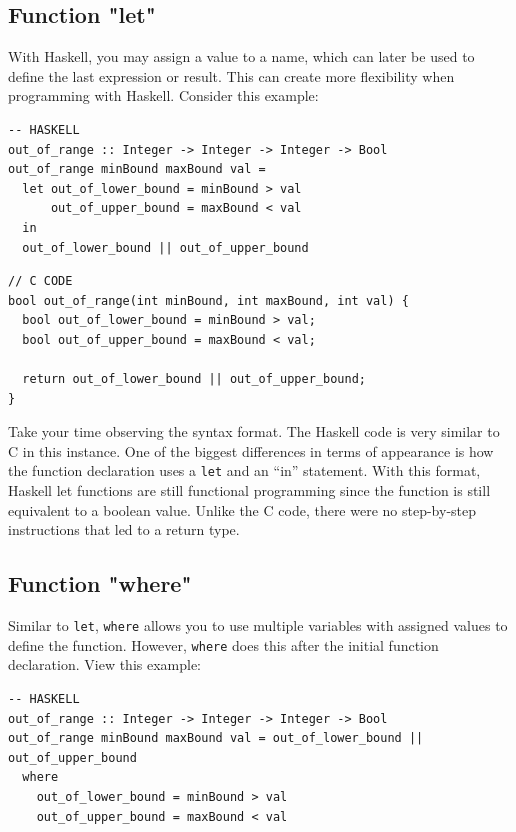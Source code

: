 \documentclass{article}
\begin{document}
\subsection{Function "let"}
\medskip\noindent
With Haskell, you may assign a value to a name, which can later be used to define the last expression or result. This can create more flexibility when programming with Haskell. Consider this example:

\begin{lstlisting}[style=HaskellStyle]
-- HASKELL
out_of_range :: Integer -> Integer -> Integer -> Bool
out_of_range minBound maxBound val =
  let out_of_lower_bound = minBound > val
      out_of_upper_bound = maxBound < val
  in
  out_of_lower_bound || out_of_upper_bound
\end{lstlisting}

\begin{lstlisting}[style=CStyle]
// C CODE
bool out_of_range(int minBound, int maxBound, int val) {
  bool out_of_lower_bound = minBound > val;
  bool out_of_upper_bound = maxBound < val;

  return out_of_lower_bound || out_of_upper_bound;
}
\end{lstlisting}

\medskip\noindent
Take your time observing the syntax format. The Haskell code is very similar to C in this instance. One of the biggest differences in terms of appearance is how the function declaration uses a \lstinline{let} and an “in” statement. With this format, Haskell let functions are still functional programming since the function is still equivalent to a boolean value. Unlike the C code, there were no step-by-step instructions that led to a return type.

\subsection{Function "where"}
\medskip\noindent
Similar to \verb|let|, \verb|where| allows you to use multiple variables with assigned values to define the function. However, \verb|where| does this after the initial function declaration. View this example:

\begin{lstlisting}[style=HaskellStyle]
-- HASKELL
out_of_range :: Integer -> Integer -> Integer -> Bool
out_of_range minBound maxBound val = out_of_lower_bound || out_of_upper_bound
  where
    out_of_lower_bound = minBound > val
    out_of_upper_bound = maxBound < val
\end{lstlisting}
\end{document}
